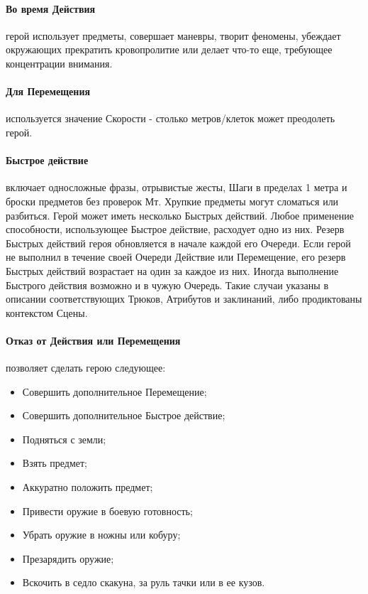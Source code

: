 \paragraph{Во время Действия} герой использует предметы, совершает маневры, творит феномены, убеждает окружающих прекратить кровопролитие или делает что-то еще, требующее концентрации внимания. 
\paragraph{Для Перемещения} используется значение Скорости - столько метров/клеток может преодолеть герой.
\paragraph{Быстрое действие} включает односложные фразы, отрывистые жесты, Шаги в пределах 1 метра и броски предметов без проверок Мт. Хрупкие предметы могут сломаться или разбиться. 
\newline Герой может иметь несколько Быстрых действий. Любое применение способности, использующее Быстрое действие, расходует одно из них. Резерв Быстрых действий героя обновляется в начале каждой его Очереди. Если герой не выполнил в течение своей Очереди Действие или Перемещение, его резерв Быстрых действий возрастает на один за каждое из них.
\newline Иногда выполнение Быстрого действия возможно и в чужую Очередь. Такие случаи указаны в описании соответствующих Трюков, Атрибутов и заклинаний, либо продиктованы контекстом Сцены.

\paragraph{Отказ от Действия или Перемещения} позволяет сделать герою следующее: 
\begin{itemize}
  \item Совершить дополнительное Перемещение;
  \item Совершить дополнительное Быстрое действие;
  \item Подняться с земли;
  \item Взять предмет;
  \item Аккуратно положить предмет;
  \item Привести оружие в боевую готовность;
  \item Убрать оружие в ножны или кобуру;
  \item Презарядить оружие;
  \item Вскочить в седло скакуна, за руль тачки или в ее кузов.
\end{itemize}


